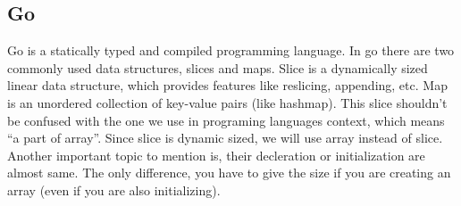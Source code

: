 \documentclass{article}
\begin{document}
\newpage











\subsection{Go}
 Go is a statically typed and compiled programming language. In go there are two commonly used data structures, slices and maps. Slice is a dynamically sized linear data structure, which provides features like reslicing, appending, etc. Map is an unordered collection of key-value pairs (like hashmap). 
This slice shouldn’t be confused with the one we use in programing languages context, which means “a part of array”. Since slice is dynamic sized, we will use array instead of slice. 
Another important topic to mention is, their decleration or initialization are almost same. The only difference, you have to give the size if you are creating an array (even if you are also initializing). 
\end{document}
